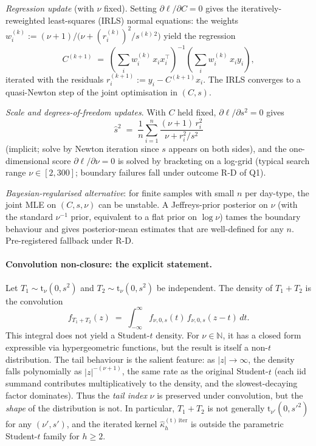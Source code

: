\documentclass[11pt]{article}
\newcommand{\Nb}{\mathbb{N}}
\newcommand{\Studt}{\mathrm{t}}
\theoremstyle{definition}
\theoremstyle{plain}
\begin{document}
\emph{Regression update} (with $\nu$ fixed). Setting
$\partial \ell / \partial C = 0$ gives the iteratively-reweighted
least-squares (IRLS) normal equations: the weights
$w_i^{(k)} := (\nu + 1) / \bigl(\nu + (r_i^{(k)})^{2}/s^{(k)\, 2}\bigr)$
yield the regression
\begin{equation}
  \label{eq:t-irls}
  C^{(k+1)} \;=\;
  \left(\sum_{i} w_i^{(k)}\, x_i x_i^{\top}\right)^{-1}
  \left(\sum_{i} w_i^{(k)}\, x_i y_i\right),
\end{equation}
iterated with the residuals $r_i^{(k+1)} := y_i - C^{(k+1)} x_i$.
The IRLS converges to a quasi-Newton step of the joint optimisation
in $(C, s)$.

\emph{Scale and degrees-of-freedom updates}. With $C$ held fixed,
$\partial \ell / \partial s^{2} = 0$ gives
\begin{equation}
  \label{eq:t-scale}
  \hat s^{2} \;=\; \frac{1}{n} \sum_{i=1}^{n}
    \frac{(\nu+1)\, r_i^{2}}{\nu + r_i^{2}/s^{2}}
\end{equation}
(implicit; solve by Newton iteration since $s$ appears on both
sides), and the one-dimensional score
$\partial \ell / \partial \nu = 0$ is solved by bracketing on a
log-grid (typical search range $\nu \in [2, 300]$;
boundary failures fall under outcome R-D of Q1).

\emph{Bayesian-regularised alternative}: for finite samples with
small $n$ per day-type, the joint MLE on $(C, s, \nu)$ can be
unstable. A Jeffreys-prior posterior on $\nu$ (with the standard
$\nu^{-1}$ prior, equivalent to a flat prior on $\log \nu$) tames
the boundary behaviour and gives posterior-mean estimates that
are well-defined for any $n$. Pre-registered fallback under R-D.

\paragraph{Convolution non-closure: the explicit statement.}
Let $T_1 \sim \Studt_{\nu}(0, s^{2})$ and $T_2 \sim \Studt_{\nu}(0, s^{2})$
be independent. The density of $T_1 + T_2$ is the convolution
\begin{equation}
  \label{eq:t-convolution}
  f_{T_1 + T_2}(z) \;=\;
  \int_{-\infty}^{\infty}
    f_{\nu, 0, s}(t)\, f_{\nu, 0, s}(z - t)\, dt.
\end{equation}
This integral does not yield a Student-$t$ density. For
$\nu \in \Nb$, it has a closed form expressible via hypergeometric
functions, but the result is itself a non-$t$ distribution. The
tail behaviour is the salient feature: as $|z| \to \infty$, the
density falls polynomially as $|z|^{-(\nu + 1)}$, the same rate as
the original Student-$t$ (each iid summand contributes
multiplicatively to the density, and the slowest-decaying factor
dominates). Thus the \emph{tail index} $\nu$ is preserved under
convolution, but the \emph{shape} of the distribution is not.
In particular, $T_1 + T_2$ is not generally $\Studt_{\nu'}(0, s'^{2})$
for any $(\nu', s')$, and the iterated kernel
$\hat\kappa_h^{(\Studt)\, \mathrm{iter}}$ is outside the parametric
Student-$t$ family for $h \geq 2$.
\end{document}
